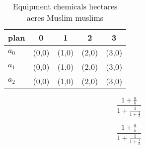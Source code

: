 \documentclass[a4paper]{article}
\begin{document}
\begin{table}
\begin{adjustbox}{width=0.6\columnwidth}
\begin{tabular}{|l|l|l|l|l|}
\hline
\textbf{plan} & \multicolumn{1}{c|}{\textbf{0}} & \multicolumn{1}{c|}{\textbf{1}} & \multicolumn{1}{c|}{\textbf{2}} & \multicolumn{1}{c|}{\textbf{3}} \\ \hline
\textbf{$a_0$}  & (0,0) & (1,0) & (2,0) & (3,0) \\ \hline
\textbf{$a_1$}  & (0,0) & (1,0) & (2,0) & (3,0) \\ \hline
\textbf{$a_2$}  & (0,0) & (1,0) & (2,0) & (3,0) \\ \hline
\end{tabular}
\end{adjustbox}
\caption{Equipment chemicals hectares acres Muslim muslims
}
\end{table}

\[ \frac{1+\frac{a}{b}}{1+\frac{1}{1+\frac{1}{a}}} \]

\[ \frac{1+\frac{a}{b}}{1+\frac{1}{1+\frac{1}{a}}} \]
\end{document}
